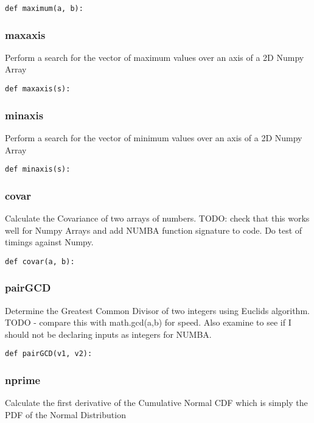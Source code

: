\documentclass[twoside,11pt]{book}
\begin{document}
\begin{lstlisting}
def maximum(a, b):
\end{lstlisting}

\subsubsection*{{\bf maxaxis}}
Perform a search for the vector of maximum values over an axis of a 2D Numpy Array  

\begin{lstlisting}
def maxaxis(s):
\end{lstlisting}

\subsubsection*{{\bf minaxis}}
Perform a search for the vector of minimum values over an axis of a 2D Numpy Array  

\begin{lstlisting}
def minaxis(s):
\end{lstlisting}

\subsubsection*{{\bf covar}}
Calculate the Covariance of two arrays of numbers. TODO: check that this works well for Numpy Arrays and add NUMBA function signature to code. Do test of timings against Numpy.  

\begin{lstlisting}
def covar(a, b):
\end{lstlisting}

\subsubsection*{{\bf pairGCD}}
Determine the Greatest Common Divisor of two integers using Euclids algorithm. TODO - compare this with math.gcd(a,b) for speed. Also examine to see if I should not be declaring inputs as integers for NUMBA.  

\begin{lstlisting}
def pairGCD(v1, v2):
\end{lstlisting}

\subsubsection*{{\bf nprime}}
Calculate the first derivative of the Cumulative Normal CDF which is simply the PDF of the Normal Distribution  
\end{document}
